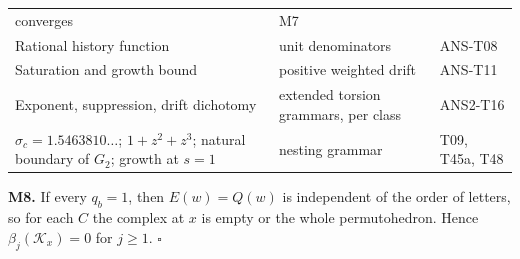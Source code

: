 \documentclass[
  11pt,
]{article}
\begin{document}
\begin{longtable}[]{@{}lll@{}}
\begin{minipage}[t]{0.40\columnwidth}
converges\strut
\end{minipage} & \begin{minipage}[t]{0.22\columnwidth}\raggedright
M7\strut
\end{minipage}\tabularnewline
\begin{minipage}[t]{0.30\columnwidth}\raggedright
Rational history function\strut
\end{minipage} & \begin{minipage}[t]{0.40\columnwidth}\raggedright
unit denominators\strut
\end{minipage} & \begin{minipage}[t]{0.22\columnwidth}\raggedright
ANS-T08\strut
\end{minipage}\tabularnewline
\begin{minipage}[t]{0.30\columnwidth}\raggedright
Saturation and growth bound\strut
\end{minipage} & \begin{minipage}[t]{0.40\columnwidth}\raggedright
positive weighted drift\strut
\end{minipage} & \begin{minipage}[t]{0.22\columnwidth}\raggedright
ANS-T11\strut
\end{minipage}\tabularnewline
\begin{minipage}[t]{0.30\columnwidth}\raggedright
Exponent, suppression, drift dichotomy\strut
\end{minipage} & \begin{minipage}[t]{0.40\columnwidth}\raggedright
extended torsion grammars, per class\strut
\end{minipage} & \begin{minipage}[t]{0.22\columnwidth}\raggedright
ANS2-T16\strut
\end{minipage}\tabularnewline
\begin{minipage}[t]{0.30\columnwidth}\raggedright
\(\sigma_c=1.5463810\ldots\); \(1+z^2+z^3\); natural boundary of
\(G_2\); growth at \(s=1\)\strut
\end{minipage} & \begin{minipage}[t]{0.40\columnwidth}\raggedright
nesting grammar\strut
\end{minipage} & \begin{minipage}[t]{0.22\columnwidth}\raggedright
T09, T45a, T48\strut
\end{minipage}\tabularnewline
\bottomrule
\end{longtable}

\textbf{M8.} If every \(q_b=1\), then \(E(w)=Q(w)\) is independent of
the order of letters, so for each \(C\) the complex at \(x\) is empty or
the whole permutohedron. Hence \(\beta_j(\mathcal K_x)=0\) for
\(j\ge1\). \(\square\)
\end{document}
